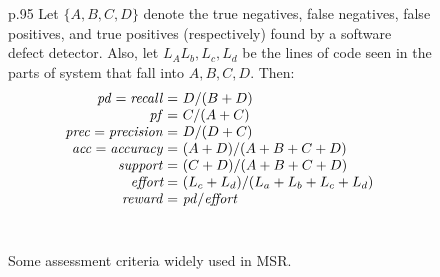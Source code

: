 \documentclass[table, xcdraw, sigconf,review, anonymous]{acmart}
\begin{document}
  
\begin{figure}[!b]
\small
\begin{tabular}{p{.95\linewidth}}\hline
{}
Let $\{A,B,C,D\}$ denote the
true negatives,
false negatives,
false positives, and
true positives
(respectively) found by a software defect detector.
Also, let $L_A L_b, L_c, L_d$ be the lines of code
seen in the parts of system that fall
into $A,B,C,D$. Then:
\[
\begin{array}{r@{~}l}
\mathit{pd}=\mathit{recall}=&D / (B+D)\\
\mathit{pf}=&C / (A+C)\\
\mathit{prec}=\mathit{precision}=&D / (D+C)\\
\mathit{acc}=\mathit{accuracy}=&(A+D) / (A+B+C+D)\\
\mathit{support}=&(C+D) / (A+B+C+D)\\
\textit{effort}=&(L_c+L_d) / (L_a + L_b + L_c + L_d)\\
\mathit{reward}=&\mathit{pd} / \textit{effort}
\end{array}
\]\\\hline
\end{tabular}
\caption{Some assessment criteria widely used in MSR.}\label{fig:criteria}
\end{figure}
\end{document}
